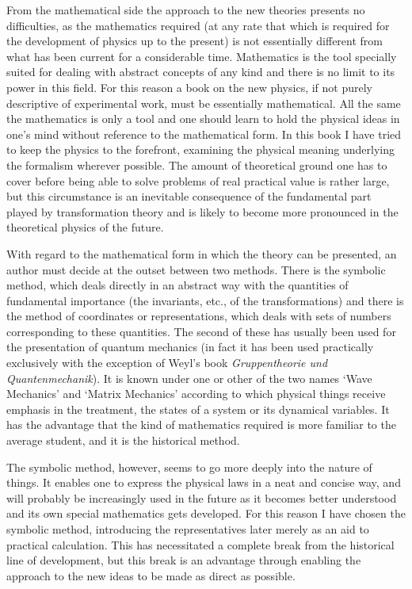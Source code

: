 From the mathematical side the approach to the new theories presents no difficulties, as the mathematics required (at any rate that which is required for the development of physics up to the present) is not essentially different from what has been current for a considerable time.  Mathematics is the tool specially suited for dealing with abstract concepts of any kind and there is no limit to its power in this field.  For this reason a book on the new physics, if not purely descriptive of experimental work, must be essentially mathematical.  All the same the mathematics is only a tool and one should learn to hold the physical ideas in one's mind without reference to the mathematical form.  In this book I have tried to keep the physics to the forefront, examining the physical meaning underlying the formalism wherever possible.  The amount of theoretical ground one has to cover before being able to solve problems of real practical value is rather large, but this circumstance is an inevitable consequence of the fundamental part played by transformation theory and is likely to become more pronounced in the theoretical physics of the future.

With regard to the mathematical form in which the theory can be presented, an author must decide at the outset between two methods.  There is the symbolic method, which deals directly in an abstract way with the quantities of fundamental importance (the invariants, etc., of the transformations) and there is the method of coordinates or representations, which deals with sets of numbers corresponding to these quantities.  The second of these has usually been used for the presentation of quantum mechanics (in fact it has been used practically exclusively with the exception of Weyl's book \emph{Gruppentheorie und Quantenmechanik}).  It is known under one or other of the two names `Wave Mechanics' and `Matrix Mechanics' according to which physical things receive emphasis in the treatment, the states of a system or its dynamical variables.  It has the advantage that the kind of mathematics required is more familiar to the average student, and it is the historical method.

The symbolic method, however, seems to go more deeply into the nature of things.  It enables one to express the physical laws in a neat and concise way, and will probably be increasingly used in the future as it becomes better understood and its own special mathematics gets developed.  For this reason I have chosen the symbolic method, introducing the representatives later merely as an aid to practical calculation.  This has necessitated a complete break from the historical line of development, but this break is an advantage through enabling the approach to the new ideas to be made as direct as possible. \vspace{5mm}

